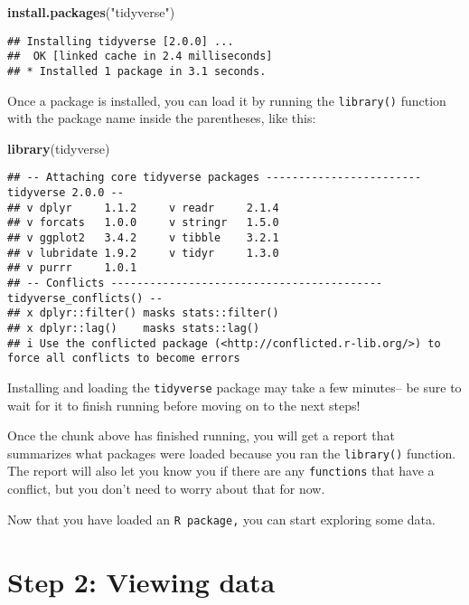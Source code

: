 \documentclass[
]{article}
\newenvironment{Shaded}{\begin{snugshade}}{\end{snugshade}}
\newcommand{\FunctionTok}[1]{\textcolor[rgb]{0.13,0.29,0.53}{\textbf{#1}}}
\newcommand{\NormalTok}[1]{#1}
\newcommand{\StringTok}[1]{\textcolor[rgb]{0.31,0.60,0.02}{#1}}
\begin{document}
\begin{Shaded}
\begin{Highlighting}[]
\FunctionTok{install.packages}\NormalTok{(}\StringTok{"tidyverse"}\NormalTok{)}
\end{Highlighting}
\end{Shaded}

\begin{verbatim}
## Installing tidyverse [2.0.0] ...
##  OK [linked cache in 2.4 milliseconds]
## * Installed 1 package in 3.1 seconds.
\end{verbatim}

Once a package is installed, you can load it by running the
\texttt{library()} function with the package name inside the
parentheses, like this:

\begin{Shaded}
\begin{Highlighting}[]
\FunctionTok{library}\NormalTok{(tidyverse)}
\end{Highlighting}
\end{Shaded}

\begin{verbatim}
## -- Attaching core tidyverse packages ------------------------ tidyverse 2.0.0 --
## v dplyr     1.1.2     v readr     2.1.4
## v forcats   1.0.0     v stringr   1.5.0
## v ggplot2   3.4.2     v tibble    3.2.1
## v lubridate 1.9.2     v tidyr     1.3.0
## v purrr     1.0.1     
## -- Conflicts ------------------------------------------ tidyverse_conflicts() --
## x dplyr::filter() masks stats::filter()
## x dplyr::lag()    masks stats::lag()
## i Use the conflicted package (<http://conflicted.r-lib.org/>) to force all conflicts to become errors
\end{verbatim}

Installing and loading the \texttt{tidyverse} package may take a few
minutes-- be sure to wait for it to finish running before moving on to
the next steps!

Once the chunk above has finished running, you will get a report that
summarizes what packages were loaded because you ran the
\texttt{library()} function. The report will also let you know you if
there are any \texttt{functions} that have a conflict, but you don't
need to worry about that for now.

Now that you have loaded an \texttt{R\ package,} you can start exploring
some data.

\hypertarget{step-2-viewing-data}{%
\section{Step 2: Viewing data}\label{step-2-viewing-data}}
\end{document}
